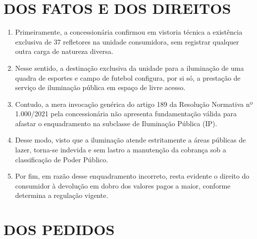 \newcommand{\tipoRequerimento}{Cobrança indevida sobre enquadramento tarifário incorreto}
\section{DOS FATOS E DOS DIREITOS}

\begin{enumerate}[resume]
    \item Primeiramente, a concessionária confirmou em vistoria técnica a existência exclusiva de 37 refletores na unidade consumidora, sem registrar qualquer outra carga de natureza diversa.
    \item Nesse sentido, a destinação exclusiva da unidade para a iluminação de uma quadra de esportes e campo de futebol configura, por si só, a prestação de serviço de iluminação pública em espaço de livre acesso.
    \item Contudo, a mera invocação genérica do artigo 189 da Resolução Normativa nº 1.000/2021 pela concessionária não apresenta fundamentação válida para afastar o enquadramento na subclasse de Iluminação Pública (IP).
    \item Desse modo, visto que a iluminação atende estritamente a áreas públicas de lazer, torna-se indevida e sem lastro a manutenção da cobrança sob a classificação de Poder Público.
    \item Por fim, em razão desse enquadramento incorreto, resta evidente o direito do consumidor à devolução em dobro dos valores pagos a maior, conforme determina a regulação vigente.
\end{enumerate}

\section{DOS PEDIDOS}

